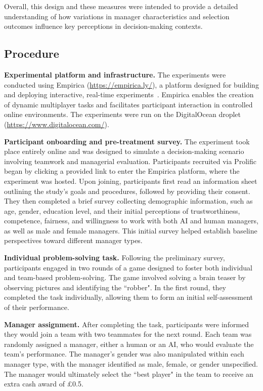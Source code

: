 \documentclass{article}
\begin{document}
{Overall, this design and these measures were intended to provide a detailed understanding of how variations in manager characteristics and selection outcomes influence key perceptions in decision-making contexts.

\subsection*{Procedure} 

\textbf{Experimental platform and infrastructure.} The experiments were conducted using Empirica (\url{https://empirica.ly/}), a platform designed for building and deploying interactive, real-time experiments~\cite{almaatouq2021empirica}. Empirica enables the creation of dynamic multiplayer tasks and facilitates participant interaction in controlled online environments. 
The experiments were run on the DigitalOcean droplet (\url{https://www.digitalocean.com/}). 
\vspace{0.3cm}

\noindent\textbf{Participant onboarding and pre-treatment survey.}
The experiment took place entirely online and was designed to simulate a decision-making scenario involving teamwork and managerial evaluation. 
Participants recruited via Prolific began by clicking a provided link to enter the Empirica platform, where the experiment was hosted.
Upon joining, participants first read an information sheet outlining the study's goals and procedures, followed by providing their consent. They then completed a brief survey collecting demographic information, such as age, gender, education level, and their initial perceptions of trustworthiness, competence, fairness, and willingness to work with both AI and human managers, as well as male and female managers. This initial survey helped establish baseline perspectives toward different manager types. 
\vspace{0.3cm}

\noindent\textbf{Individual problem-solving task.}
Following the preliminary survey, participants engaged in two rounds of a game designed to foster both individual and team-based problem-solving. 
The game involved solving a brain teaser by observing pictures and identifying the ``robber".
In the first round, they completed the task individually, allowing them to form an initial self-assessment of their performance. 
\vspace{0.3cm}

\noindent\textbf{Manager assignment.}
After completing the task, participants were informed they would join a team with two teammates for the next round. Each team was randomly assigned a manager, either a human or an AI, who would evaluate the team's performance. The manager's gender was also manipulated within each manager type, with the manager identified as male, female, or gender unspecified. The manager would ultimately select the ``best player" in the team to receive an extra cash award of \pounds0.5.
\vspace{0.3cm}

}
\end{document}
